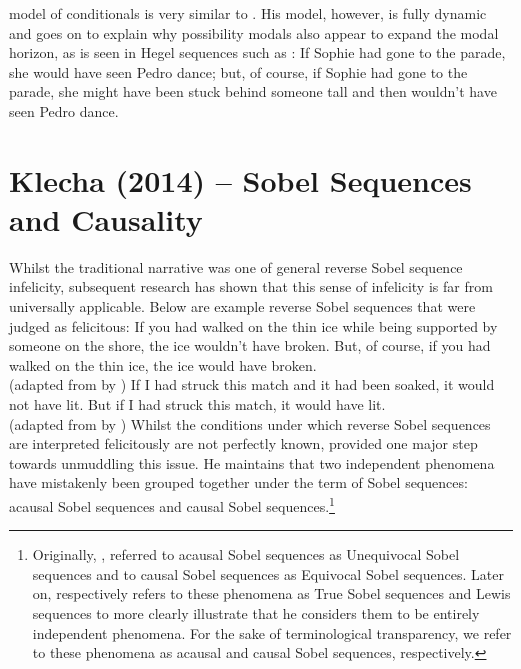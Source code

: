  model of conditionals is very similar to . His model, however, is fully dynamic and goes on to explain why possibility modals also appear to expand the modal horizon, as is seen in Hegel sequences such as :
\ex{} If Sophie had gone to the parade, she would have seen Pedro dance;
but, of course, if Sophie had gone to the parade, she might have been stuck behind
someone tall and then wouldn’t have seen Pedro dance.\hfill\parencite[p. 342]{Gillies2007}
\xe
\section{Klecha (2014) -- Sobel Sequences and Causality}
Whilst the traditional narrative was one of general reverse Sobel sequence infelicity, subsequent research has shown that this sense of infelicity is far from universally applicable. Below are example reverse Sobel sequences that were judged as felicitous:
\ex{} If you had walked on the thin ice while being supported by someone on the shore, the ice wouldn't have broken. But, of course, if you had walked on the thin ice, the ice would have broken.\\%
\emptyfill(adapted from \textcite[p. 166]{Bennett2003} by \textcite[p. 488]{Lewis2018})
\xe
\ex{}If I had struck this match and it had been soaked, it would not have lit. But if I had struck this match, it would have lit.\\%
\emptyfill(adapted from \textcite[p. 106]{Stalnaker1968} by \textcite[p. 487]{Lewis2018})
\xe
Whilst the conditions under which reverse Sobel sequences are interpreted felicitously are not perfectly known, \textcite{Klecha2014,Klecha2015} provided one major step towards unmuddling this issue. He maintains that two independent phenomena have mistakenly been grouped together under the term of Sobel sequences: acausal Sobel sequences and causal Sobel sequences.\footnote{Originally, \textcite{Klecha2014}, referred to acausal Sobel sequences as Unequivocal Sobel sequences and to causal Sobel sequences as Equivocal Sobel sequences. Later on, \textcite{Klecha2015} respectively refers to these phenomena as True Sobel sequences and Lewis sequences to more clearly illustrate that he considers them to be entirely independent phenomena. For the sake of terminological transparency, we refer to these phenomena as acausal and causal Sobel sequences, respectively.} 

